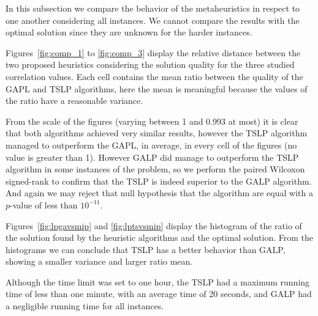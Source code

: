 In this subsection we compare the behavior of the metaheuristics in respect to one another
considering all instances. We cannot compare the results with the optimal solution since they are unknown for the harder instances.

Figures~\ref{fig:comp_1} to \ref{fig:comp_3} display the relative distance between the two proposed 
heuristics considering the solution quality for the three studied correlation values.
Each cell contains the mean ratio between the quality of the GAPL and TSLP algorithms,
here the mean is meaningful because the values of the ratio have a reasonable variance.

From the scale of the figures (varying between 1 and 0.993 at most) it is clear
that both algorithms achieved very similar results, however the TSLP algorithm
managed to outperform the GAPL, in average, in every cell of the figures (no value is greater than 1).
However GALP did manage to outperform the TSLP algorithm in some instances of the problem,
so we perform the paired Wilcoxon signed-rank to confirm that the TSLP is indeed superior
to the GALP algorithm. And again we may reject that null hypothesis that the algorithm
are equal with a $p$-value of less than $10^{-11}$.

Figures~\ref{fig:lpgavsmip} and \ref{fig:lptsvsmip} display the histogram of
the ratio of the solution found by the heuristic algorithms and the optimal solution.
From the histograms we can conclude that TSLP has a better behavior than GALP,
showing a smaller variance and larger ratio mean.

Although the time limit was set to one hour, the TSLP had a maximum running time of less than one minute, with an average time of 20 seconds, and GALP had a negligible running time for all instances.

